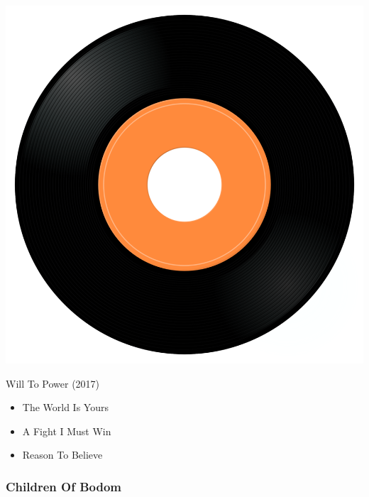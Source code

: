 \begin{minipage}[t]{0.25\textwidth}\vspace{0pt}
\captionsetup{type=figure}
\includegraphics[width=\textwidth]{Images/cover.png}
\caption*{Will To Power (2017)}
\end{minipage}
\begin{minipage}[t]{0.25\textwidth}\vspace{0pt}
\begin{itemize}[nosep,leftmargin=1em,labelwidth=*,align=left]
	\setlength{\itemsep}{0pt}
	\item The World Is Yours
	\item A Fight I Must Win
	\item Reason To Believe
\end{itemize}
\end{minipage}

\subsubsection{Children Of Bodom}

